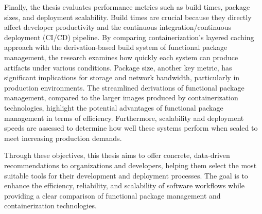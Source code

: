 Finally, the thesis evaluates performance metrics such as build times, package sizes,
and deployment scalability. Build times are crucial because they directly affect
developer productivity and the continuous integration/continuous deployment (CI/CD)
pipeline. By comparing containerization's layered caching approach with the derivation-based
build system of functional package management, the research examines how quickly each
system can produce artifacts under various conditions. Package size, another key metric,
has significant implications for storage and network bandwidth, particularly in
production environments. The streamlined derivations of functional package management,
compared to the larger images produced by containerization technologies, highlight
the potential advantages of functional package management in terms of efficiency.
Furthermore, scalability and deployment speeds are assessed to determine how well
these systems perform when scaled to meet increasing production demands.

Through these objectives, this thesis aims to offer concrete, data-driven recommendations
to organizations and developers, helping them select the most suitable tools for their
development and deployment processes. The goal is to enhance the efficiency, reliability,
and scalability of software workflows while providing a clear comparison of functional
package management and containerization technologies.
